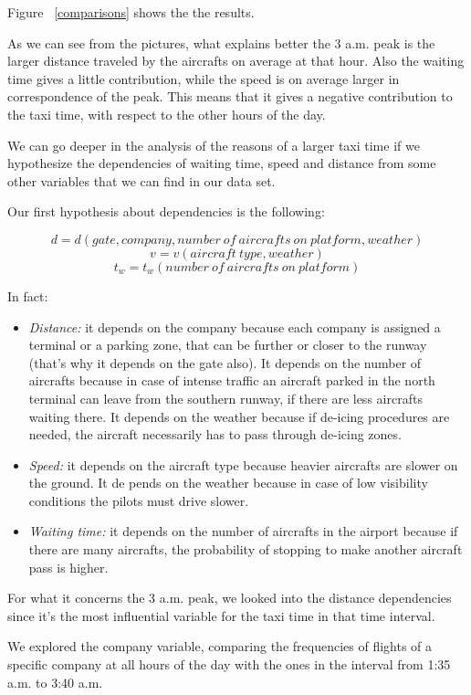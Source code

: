 \documentclass{article}
\begin{document}
Figure ~\ref{comparisons} shows the the results.

As we can see from the pictures, what explains better the 3 a.m. peak is the larger distance traveled by the aircrafts on average at that hour. Also the waiting time gives a little contribution, while the speed is on average larger in correspondence of the peak. This means that it gives a negative contribution to the taxi time, with respect to the other hours of the day.

\bigskip
We can go deeper in the analysis of the reasons of a larger taxi time if we hypothesize the dependencies of waiting time, speed and distance from some other variables that we can find in our data set. 

Our first hypothesis about dependencies is the following:

\[d=d(gate,company, number \ of \ aircrafts \ on \ platform, weather)\]
\[v=v(aircraft \ type, weather)\]
\[t_w=t_w(number \ of \ aircrafts \ on \ platform)\]

In fact:
\begin{itemize}
	\item \textit{Distance:} it depends on the company because each company is assigned a terminal or a parking zone, that can be further or closer to the runway (that's why it depends on the gate also). It depends on the number of aircrafts because in case of intense traffic an aircraft parked in the north terminal can leave from the southern runway, if there are less aircrafts waiting there. It depends on the weather because if de-icing procedures are needed, the aircraft necessarily has to pass through de-icing zones.
	\item \textit{Speed:} it depends on the aircraft type because heavier aircrafts are slower on the ground. It de
	pends on the weather because in case of low visibility conditions the pilots must drive slower.
	\item \textit{Waiting time:} it depends on the number of aircrafts in the airport because if there are many aircrafts, the probability of stopping to make another aircraft pass is higher.
 \end{itemize}

For what it concerns the 3 a.m. peak, we looked into the distance dependencies since it's the most influential variable for the taxi time in that time interval. 

We explored the company variable, comparing the frequencies of flights of a specific company at all hours of the day with the ones in the interval from 1:35 a.m. to 3:40 a.m.
\end{document}
